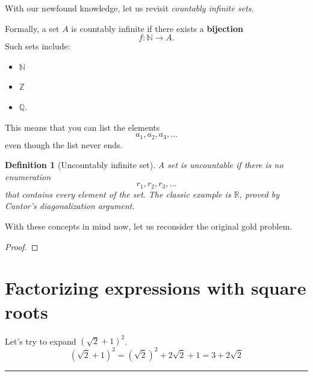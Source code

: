 \documentclass{article}
\newtheorem{definition}{Definition}
\begin{document}
    
With our newfound knowledge, let us revisit \emph{countably infinite sets}.

    Formally, a set $A$ is countably infinite if there exists a \textbf{bijection}
    \[
    f: \mathbb{N} \rightarrow A.
    \]
    Such sets include:
    \begin{itemize}
        \item $\mathbb{N}$
        \item $\mathbb{Z}$
        \item $\mathbb{Q}$.
    \end{itemize}
    This means that you can list the elements
    \[
    a_1, a_2, a_3,...
    \]
    even though the list never ends.

\begin{definition}[Uncountably infinite set]
    A set is uncountable if there is no enumeration
    \[
    r_1, r_2, r_3,...
    \]
    that contains every element of the set. 
    The classic example is $\mathbb{R}$, proved by Cantor's diagonalization argument.
\end{definition}


With these concepts in mind now, let us reconsider the original gold problem.

\begin{proof}
\end{proof}

\section{Factorizing expressions with square roots}
Let's try to expand $(\sqrt{2} + 1)^2$.
\[
    (\sqrt{2}+1)^2 = (\sqrt{2})^2 + 2\sqrt{2} + 1 = 3 + 2\sqrt{2}
\]

\hrule
\vspace{10pt}
\end{document}
